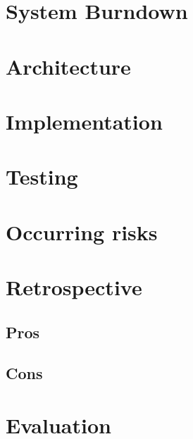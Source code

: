 \section{System Burndown}
\section{Architecture}
\section{Implementation}
\section{Testing}
\section{Occurring risks}
\section{Retrospective}
\subsection{Pros}
\subsection{Cons}
\section{Evaluation}